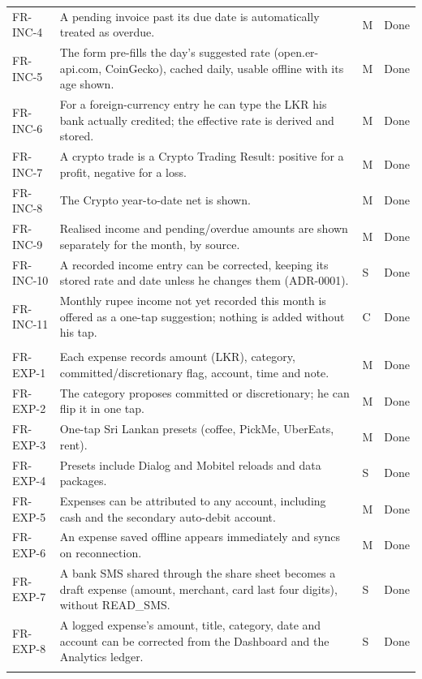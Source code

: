 \documentclass[11pt,a4paper]{article}
\begin{document}
\begin{longtable}{|>{\raggedright\arraybackslash}p{2.2cm}|>{\raggedright\arraybackslash}p{9.5cm}|C{0.7cm}|>{\raggedright\arraybackslash}p{1.6cm}|}
FR-INC-4 & A pending invoice past its due date is automatically treated as overdue. & M & Done\\
FR-INC-5 & The form pre-fills the day's suggested rate (open.er-api.com, CoinGecko), cached daily, usable offline with its age shown. & M & Done\\
FR-INC-6 & For a foreign-currency entry he can type the LKR his bank actually credited; the effective rate is derived and stored. & M & Done\\
FR-INC-7 & A crypto trade is a Crypto Trading Result: positive for a profit, negative for a loss. & M & Done\\
FR-INC-8 & The Crypto year-to-date net is shown. & M & Done\\
FR-INC-9 & Realised income and pending/overdue amounts are shown separately for the month, by source. & M & Done\\
FR-INC-10 & A recorded income entry can be corrected, keeping its stored rate and date unless he changes them (ADR-0001). & S & Done\\
FR-INC-11 & Monthly rupee income not yet recorded this month is offered as a one-tap suggestion; nothing is added without his tap. & C & Done\\
\\
FR-EXP-1 & Each expense records amount (LKR), category, committed/discretionary flag, account, time and note. & M & Done\\
FR-EXP-2 & The category proposes committed or discretionary; he can flip it in one tap. & M & Done\\
FR-EXP-3 & One-tap Sri Lankan presets (coffee, PickMe, UberEats, rent). & M & Done\\
FR-EXP-4 & Presets include Dialog and Mobitel reloads and data packages. & S & Done\\
FR-EXP-5 & Expenses can be attributed to any account, including cash and the secondary auto-debit account. & M & Done\\
FR-EXP-6 & An expense saved offline appears immediately and syncs on reconnection. & M & Done\\
FR-EXP-7 & A bank SMS shared through the share sheet becomes a draft expense (amount, merchant, card last four digits), without READ\_SMS. & S & Done\\
FR-EXP-8 & A logged expense's amount, title, category, date and account can be corrected from the Dashboard and the Analytics ledger. & S & Done\\
\\

\end{longtable}
\end{document}
